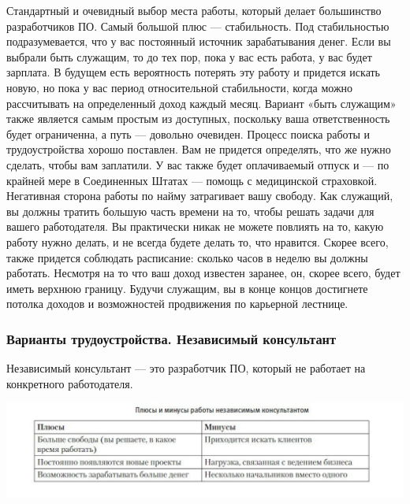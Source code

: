 \documentclass{../industrial-development}
\begin{document}
\lecturenotes
Стандартный и очевидный выбор места работы, который делает большинство разработчиков ПО. 
Самый большой плюс — стабильность. Под стабильностью подразумевается, что у вас постоянный источник зарабатывания денег. Если вы выбрали быть служащим, то до тех пор, пока у вас есть работа, у вас будет зарплата. В будущем есть вероятность  потерять эту работу и придется искать новую, но пока у вас период относительной стабильности, когда можно рассчитывать на определенный доход каждый месяц.
Вариант «быть служащим» также является самым простым из доступных, поскольку ваша ответственность будет ограниченна, а путь — довольно очевиден. Процесс поиска работы и трудоустройства хорошо поставлен. Вам не придется определять, что же нужно сделать, чтобы вам заплатили. У вас также будет оплачиваемый отпуск и — по крайней мере в Соединенных Штатах — помощь с медицинской страховкой.
Негативная сторона работы по найму затрагивает вашу свободу. Как служащий, вы должны тратить большую часть времени на то, чтобы решать задачи для вашего работодателя. Вы практически никак не можете повлиять на то, какую работу нужно делать, и не всегда будете делать то, что нравится. Скорее всего, также придется соблюдать расписание: сколько часов в неделю вы должны работать.
Несмотря на то что ваш доход известен заранее, он, скорее всего, будет иметь верхнюю границу. Будучи служащим, вы в конце концов достигнете потолка доходов и возможностей продвижения по карьерной лестнице.


\begin{frame} \frametitle{Варианты трудоустройства. Независимый консультант}
  \begin{block}{}
    Независимый консультант --- это разработчик ПО, который не работает на конкретного работодателя. 
  \end{block}
  
    \centerline{\includegraphics[height=0.38\textheight]{11-IT-specialist's-way/fl.pdf}}
\end{frame}
\end{document}

